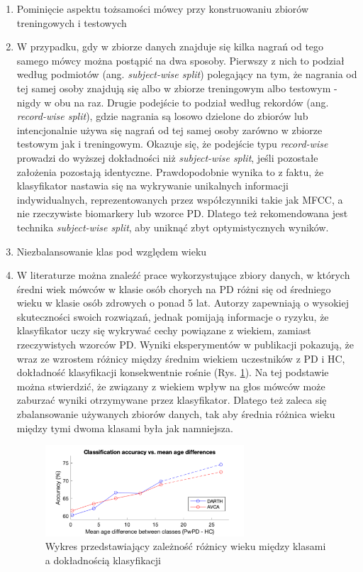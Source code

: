 \begin{enumerate}[label={\alph*)}]
	\item Pominięcie aspektu tożsamości mówcy przy konstruowaniu zbiorów treningowych i testowych
	\item[] W przypadku, gdy w zbiorze danych znajduje się kilka nagrań od tego samego mówcy można postąpić na dwa sposoby.
Pierwszy z nich to podział według podmiotów (ang. \emph{subject-wise split}) polegający na tym, że nagrania od tej samej
osoby znajdują się albo w zbiorze treningowym albo testowym - nigdy w obu na raz.
Drugie podejście to podział według rekordów (ang. \emph{record-wise split}), gdzie nagrania są losowo dzielone do zbiorów
lub intencjonalnie używa się nagrań od tej samej osoby zarówno w zbiorze testowym jak i treningowym.
Okazuje się, że podejście typu \emph{record-wise} prowadzi do wyższej dokładności niż \emph{subject-wise split}, jeśli pozostałe założenia pozostają identyczne.
Prawdopodobnie wynika to z faktu, że klasyfikator nastawia się na wykrywanie unikalnych informacji indywidualnych,
reprezentowanych przez współczynniki takie jak MFCC, a nie rzeczywiste biomarkery lub wzorce PD.
Dlatego też rekomendowana jest technika \emph{subject-wise split}, aby uniknąć zbyt optymistycznych wyników.

  	\item Niezbalansowanie klas pod względem wieku
	\item[] W literaturze można znaleźć prace wykorzystujące zbiory danych, w których średni wiek mówców
w klasie osób chorych na PD różni się od średniego wieku w klasie osób zdrowych o ponad 5 lat.
Autorzy zapewniają o wysokiej skuteczności swoich rozwiązań, jednak pomijają informacje o ryzyku, że klasyfikator
uczy się wykrywać cechy powiązane z wiekiem, zamiast rzeczywistych wzorców PD.
Wyniki eksperymentów w publikacji \cite{SustainedVowelsProblems} pokazują, że wraz ze wzrostem różnicy między średnim wiekiem uczestników z PD i HC,
dokładność klasyfikacji konsekwentnie rośnie (Rys. \ref{fig:acc_and_age_diff}).
Na tej podstawie można stwierdzić, że związany z wiekiem wpływ na głos mówców może zaburzać wyniki otrzymywane przez klasyfikator.
Dlatego też zaleca się zbalansowanie używanych zbiorów danych, tak aby średnia różnica wieku między tymi dwoma klasami była jak namniejsza.


\begin{figure}[htbp]
	\centering
	\includegraphics[width=0.7\textwidth]{./img/acc_and_age_difference}
	\caption{Wykres przedstawiający zależność różnicy wieku między klasami a dokładnością klasyfikacji \cite{SustainedVowelsProblems}}
    \label{fig:acc_and_age_diff}
\end{figure}


\end{enumerate}
